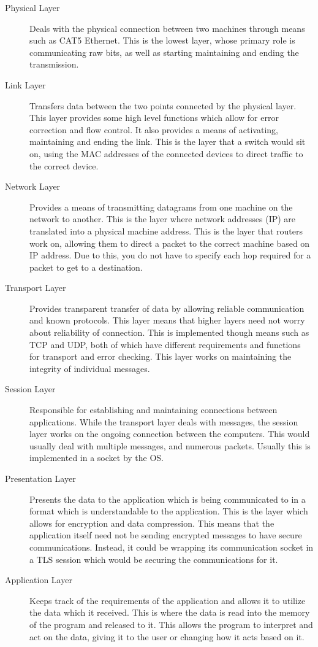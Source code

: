 		\begin{description}
			\item[Physical Layer]
				Deals with the physical connection between two machines through means such as CAT5 Ethernet.
				This is the lowest layer, whose primary role is communicating raw bits, as well as starting maintaining and ending the transmission.
			\item[Link Layer]
				Transfers data between the two points connected by the physical layer.
				This layer provides some high level functions which allow for error correction and flow control.
				It also provides a means of activating, maintaining and ending the link.
				This is the layer that a switch would sit on,
				using the MAC addresses of the connected devices to direct traffic to the correct device.
			\item[Network Layer]
				Provides a means of transmitting datagrams from one machine on the network to another.
				This is the layer where network addresses (IP) are translated into a physical machine address.
				This is the layer that routers work on, allowing them to direct a packet to the correct machine based on IP address.
				Due to this, you do not have to specify each hop required for a packet to get to a destination.
			\item[Transport Layer]
				Provides transparent transfer of data by allowing reliable communication and known protocols.
				This layer means that higher layers need not worry about reliability of connection.
				This is implemented though means such as TCP and UDP, both of which have different requirements and functions for transport and error checking.
				This layer works on maintaining the integrity of individual messages.
			\item[Session Layer]
				Responsible for establishing and maintaining connections between applications.
				While the transport layer deals with messages, the session layer works on the ongoing connection between the computers.
				This would usually deal with multiple messages, and numerous packets.
				Usually this is implemented in a socket by the OS.
			\item[Presentation Layer]
				Presents the data to the application which is being communicated to in a format which is understandable to the application.
				This is the layer which allows for encryption and data compression.
				This means that the application itself need not be sending encrypted messages to have secure communications.
				Instead, it could be wrapping its communication socket in a TLS session which would be securing the communications for it.
			\item[Application Layer]
				Keeps track of the requirements of the application and allows it to utilize the data which it received.
				This is where the data is read into the memory of the program and released to it.
				This allows the program to interpret and act on the data, giving it to the user or changing how it acts based on it.
		\end{description}
